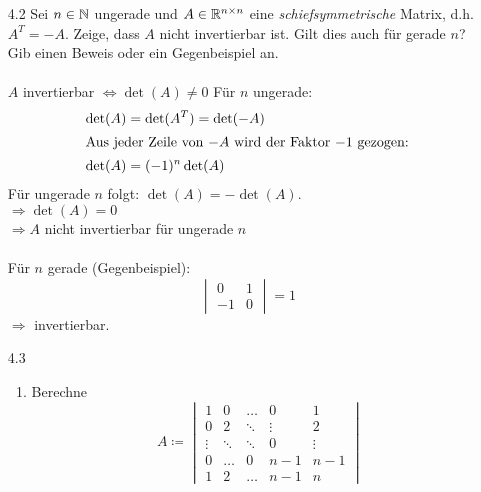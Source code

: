 \documentclass{HM}
\begin{document}
	\begin{enumerate}
	\item[4.2] Sei $n\in\mathbb{N}$ ungerade und $A\in\mathbb{R}^{n\times n}$ eine \textit{schiefsymmetrische} Matrix, d.h. $A^T=-A$. Zeige, dass $A$ nicht invertierbar ist. Gilt dies auch für gerade $n$? Gib einen Beweis oder ein Gegenbeispiel an.\\\\
		$A$ invertierbar $\Leftrightarrow \det(A)\not=0$
		Für $n$ ungerade:\\
		\begin{align*}
			\det(A)&=\det(A^T)=\det(-A)\\
			\intertext{Aus jeder Zeile von $-A$ wird der Faktor $-1$ gezogen:}
			\det(A)&=(-1)^n\det(A)
		\end{align*}
		Für ungerade $n$ folgt: $\det(A)=-\det(A)$.\\
		$\Rightarrow \det(A)=0$\\
		$\Rightarrow A$ nicht invertierbar für ungerade $n$\\\\
		Für $n$ gerade (Gegenbeispiel):
		$$\begin{vmatrix}
			0&1\\
			-1&0
		\end{vmatrix} = 1$$
		$\Rightarrow$ invertierbar.
	
	\newpage
	\item[4.3]
		\begin{enumerate}
			\item Berechne\\
			$$A\coloneqq\begin{vmatrix}
				1&0&\hdots&0&1\\
				0&2&\ddots&\vdots&2\\
				\vdots&\ddots&\ddots&0&\vdots\\
				0&\hdots&0&n-1&n-1\\
				1&2&\hdots&n-1&n
			\end{vmatrix}$$
			

\end{enumerate}
\end{enumerate}
\end{document}
